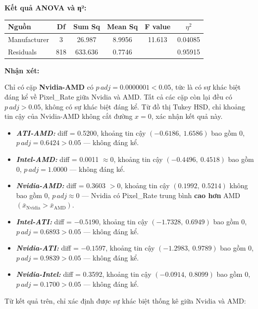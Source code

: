 \textbf{Kết quả ANOVA và η²:}

\begin{longtable}{|l|c|c|c|c|c|}
\hline
\textbf{Nguồn} & \textbf{Df} & \textbf{Sum Sq} & \textbf{Mean Sq} & \textbf{F value} & \textbf{$\eta^2$} \\
\hline
Manufacturer & 3 & 26.987 & 8.9956 & 11.613 & 0.04085 \\
\hline
Residuals    & 818 & 633.636 & 0.7746 & & 0.95915 \\
\hline
\end{longtable}

\textbf{Nhận xét:}

Chỉ có cặp \textbf{Nvidia-AMD} có $p\,adj = 0.0000001 < 0.05$, tức là có sự khác biệt đáng kể về Pixel\_Rate giữa Nvidia và AMD. Tất cả các cặp còn lại đều có $p\,adj > 0.05$, không có sự khác biệt đáng kể. Từ đồ thị Tukey HSD, chỉ khoảng tin cậy của Nvidia-AMD không cắt đường $x = 0$, xác nhận kết quả này.
    \begin{itemize}
        \item \textbf{\textit{ATI-AMD:}} diff = 0.5200, khoảng tin cậy $(-0.6186,\ 1.6586)$ bao gồm 0, $p\,adj = 0.6424 > 0.05$ — không đáng kể.
        \item \textbf{\textit{Intel-AMD:}} diff = 0.0011 $\approx 0$, khoảng tin cậy $(-0.4496,\ 0.4518)$ bao gồm 0, $p\,adj = 1.0000$ — không đáng kể.
        \item \textbf{\textit{Nvidia-AMD:}} diff = 0.3603 $> 0$, khoảng tin cậy $(0.1992,\ 0.5214)$ không bao gồm 0, $p\,adj \approx 0$ — Nvidia có Pixel\_Rate trung bình \textbf{cao hơn} AMD $({\bar{x}}_{\text{Nvidia}} > {\bar{x}}_{\text{AMD}})$.
        \item \textbf{\textit{Intel-ATI:}} diff = $-0.5190$, khoảng tin cậy $(-1.7328,\ 0.6949)$ bao gồm 0, $p\,adj = 0.6893 > 0.05$ — không đáng kể.
        \item \textbf{\textit{Nvidia-ATI:}} diff = $-0.1597$, khoảng tin cậy $(-1.2983,\ 0.9789)$ bao gồm 0, $p\,adj = 0.9839 > 0.05$ — không đáng kể.
        \item \textbf{\textit{Nvidia-Intel:}} diff = 0.3592, khoảng tin cậy $(-0.0914,\ 0.8099)$ bao gồm 0, $p\,adj = 0.1700 > 0.05$ — không đáng kể.
    \end{itemize}
    
Từ kết quả trên, chỉ xác định được sự khác biệt thống kê giữa Nvidia và AMD:

\begin{center}
\end{center}
    
